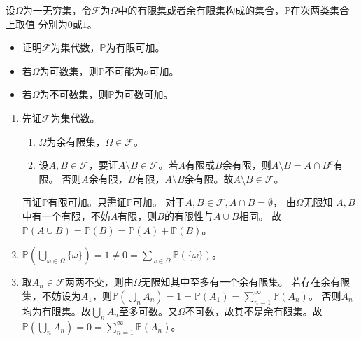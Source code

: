 \documentclass{ctexart}
\begin{document}
\begin{problem}
  设\(\Omega \)为一无穷集，令\(\mathcal{F} \)为\(\Omega \)中的有限集或者余有限集构成的集合，\(\mathbb{P} \)在次两类集合上取值
  分别为\(0 \)或\(1 \)。
  \begin{itemize}
    \item 证明\(\mathcal{F} \)为集代数，\(\mathbb{P} \)为有限可加。
    \item 若\(\Omega \)为可数集，则\(\mathbb{P} \)不可能为\(\sigma \)可加。
    \item 若\(\Omega \)为不可数集，则\(\mathbb{P} \)为可数可加。
  \end{itemize}

\end{problem}
\begin{solution}
  \begin{enumerate}
    \item
      先证\(\mathcal{F} \)为集代数。
      \begin{enumerate}
        \item \(\Omega \)为余有限集，\(\Omega \in \mathcal{F} \)。
        \item 设\(A,B \in \mathcal{F} \)，要证\(A \setminus B \in \mathcal{F} \)。若\(A \)有限或\(B \)余有限，则\(A \setminus B = A \cap B^c \)有限。
          否则\(A \)余有限，\(B \)有限，\(A \setminus B \)余有限。故\(A \setminus B \in \mathcal{F} \)。
      \end{enumerate}
      再证\(\mathbb{P}\)有限可加。只需证\(\mathbb{P} \)可加。
      对于\(A,B \in \mathcal{F},A \cap B = \emptyset \)，
      由\(\Omega \)无限知 \(A,B \)中有一个有限，不妨\(A \)有限，则\(B \)的有限性与\(A \cup B \)相同。
      故\(\mathbb{P}(A \cup B)=\mathbb{P}(B)=\mathbb{P}(A)+\mathbb{P}(B) \)。
    \item \(\mathbb{P}(\bigcup_{\omega \in \Omega}\{\omega\})=1 \neq 0 = \sum_{\omega \in \Omega}\mathbb{P}(\{\omega\}) \)。
    \item 取\(A_n \in \mathcal{F} \)两两不交，则由\(\Omega \)无限知其中至多有一个余有限集。
      若存在余有限集，不妨设为\(A_1 \)，则\(\mathbb{P}(\bigcup_{n}A_n)=1=\mathbb{P}(A_1)=\sum_{n=1}^{\infty}\mathbb{P}(A_n) \)。
      否则\(A_n \)均为有限集。故\(\bigcup_{n}A_n \)至多可数。又\(\Omega \)不可数，故其不是余有限集。故\(\mathbb{P}(\bigcup_{n}A_n)=0 = \sum_{n=1}^{\infty}\mathbb{P}(A_n) \)。
  \end{enumerate}
\end{solution}
\end{document}
